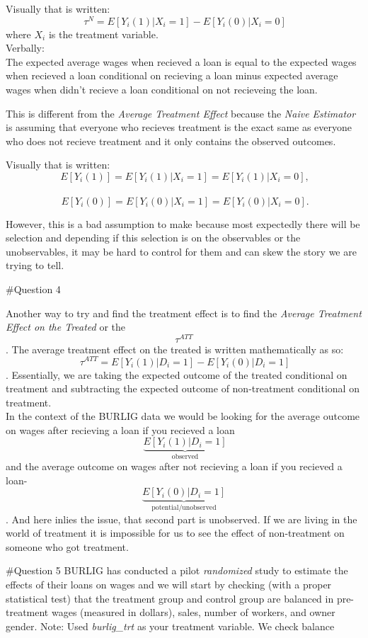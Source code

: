 \documentclass[]{article}
\begin{document}
Visually that is written:
\[\ \tau^N = E[Y_i(1)|X_i = 1] - E[Y_i(0)|X_i = 0] \] where \(X_i\) is
the treatment variable.\\
Verbally:\\
The expected average wages when recieved a loan is equal to the expected
wages when recieved a loan conditional on recieving a loan minus
expected average wages when didn't recieve a loan conditional on not
recieveing the loan.

This is different from the \emph{Average Treatment Effect} because the
\emph{Naive Estimator} is assuming that everyone who recieves treatment
is the exact same as everyone who does not recieve treatment and it only
contains the observed outcomes.

Visually that is written:
\[\ E[Y_i(1)] = E[Y_i(1)|X_i = 1] = E[Y_i(1)|X_i = 0], \]\\
\[\ E[Y_i(0)] = E[Y_i(0)|X_i = 1] = E[Y_i(0)|X_i = 0]. \]

However, this is a bad assumption to make because most expectedly there
will be selection and depending if this selection is on the observables
or the unobservables, it may be hard to control for them and can skew
the story we are trying to tell.

\#Question 4

Another way to try and find the treatment effect is to find the
\emph{Average Treatment Effect on the Treated} or the \[\tau^{ATT}\].
The average treatment effect on the treated is written mathematically as
so: \[\ \tau^{ATT} = {E[Y_i(1)|D_i = 1]} - {E[Y_i(0)|D_i = 1]} \].
Essentially, we are taking the expected outcome of the treated
conditional on treatment and subtracting the expected outcome of
non-treatment conditional on treatment.\\
In the context of the BURLIG data we would be looking for the average
outcome on wages after recieving a loan if you recieved a loan
\[\ \underbrace{E[Y_i(1)|D_i = 1]}_\textrm{observed}\]and the average
outcome on wages after not recieving a loan if you recieved a loan-
\[\underbrace{E[Y_i(0)|D_i = 1]}_\textrm{potential/unobserved} \]. And
here inlies the issue, that second part is unobserved. If we are living
in the world of treatment it is impossible for us to see the effect of
non-treatment on someone who got treatment.

\#Question 5 BURLIG has conducted a pilot \emph{randomized } study to
estimate the effects of their loans on wages and we will start by
checking (with a proper statistical test) that the treatment group and
control group are balanced in pre-treatment wages (measured in dollars),
sales, number of workers, and owner gender. Note: Used \emph{burlig\_trt
} as your treatment variable. We check balance
\end{document}
